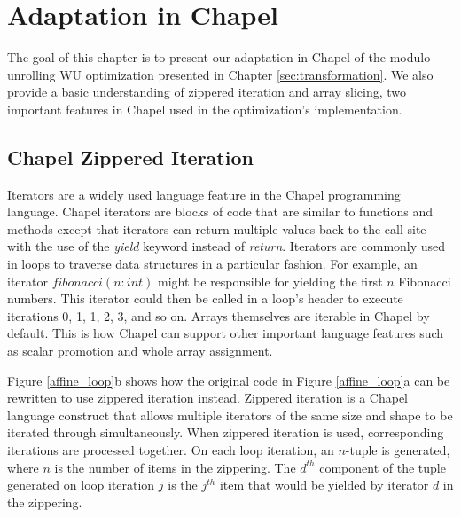 
\renewcommand{\thechapter}{7}

\chapter{Adaptation in Chapel}\label{sec:adaptation_in_chapel}


The goal of this chapter is to present our adaptation in Chapel of the modulo unrolling WU optimization presented in Chapter \ref{sec:transformation}. We also provide a basic understanding of zippered iteration and array slicing, two important features in Chapel used in the optimization's implementation. 

\section{Chapel Zippered Iteration}\label{sec:zippered_iteration}

Iterators are a widely used language feature in the Chapel programming language. Chapel iterators are blocks of code that are similar to functions and methods except that iterators can return multiple values back to the call site with the use of the \textit{yield} keyword instead of \textit{return}. Iterators are commonly used in loops to traverse data structures in a particular fashion. For example, an iterator $fibonacci(n: int)$ might be responsible for yielding the first $n$ Fibonacci numbers. This iterator could then be called in a loop's header to execute iterations 0, 1, 1, 2, 3, and so on. Arrays themselves are iterable in Chapel by default. This is how Chapel can support other important language features such as scalar promotion and whole array assignment. 

Figure \ref{affine_loop}b shows how the original code in Figure \ref{affine_loop}a can be rewritten to use zippered iteration \cite{chamberlain2011user} instead. Zippered iteration is a Chapel language construct that allows multiple iterators of the same size and shape to be iterated through simultaneously. When zippered iteration is used, corresponding iterations are processed together. On each loop iteration, an $n$-tuple is generated, where $n$ is the number of items in the zippering. The $d^{th}$ component of the tuple generated on loop iteration $j$ is the $j^{th}$ item that would be yielded by iterator $d$ in the zippering. 

